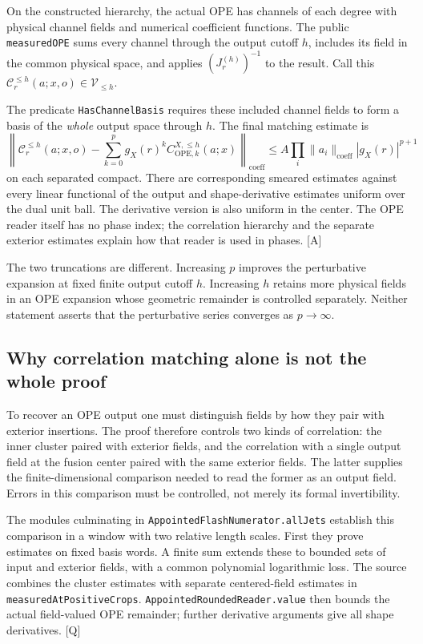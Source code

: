 \documentclass[11pt]{article}
\newcommand{\code}[1]{{\small\nolinkurl{#1}}}
\newcommand{\src}[1]{\textsf{[#1]}}
\begin{document}
On the constructed hierarchy, the actual OPE has channels of each
degree with physical channel fields and numerical coefficient
functions. The public \code{measuredOPE} sums every channel through
the output cutoff $h$, includes its field in the common physical
space, and applies $(J_r^{(h)})^{-1}$ to the result. Call this
$\mathcal C_r^{\le h}(a;x,o)\in\mathcal V_{\le h}$.

The predicate \code{HasChannelBasis} requires these included channel
fields to form a basis of the \emph{whole} output space through $h$.
The final matching estimate is
\begin{equation}\label{eq:ope-bound}
 \left\|\mathcal C_r^{\le h}(a;x,o)
       -\sum_{k=0}^{p}g_X(r)^k C^{X,\le h}_{\mathrm{OPE},k}(a;x)
 \right\|_{\mathrm{coeff}}
 \le A\prod_i\|a_i\|_{\mathrm{coeff}}|g_X(r)|^{p+1}
\end{equation}
on each separated compact. There are corresponding smeared estimates
against every linear functional of the output and shape-derivative
estimates uniform over the dual unit ball. The derivative version is
also uniform in the center. The OPE reader itself has no phase index;
the correlation hierarchy and the separate exterior estimates explain
how that reader is used in phases. \src{A}

The two truncations are different. Increasing $p$ improves the
perturbative expansion at fixed finite output cutoff $h$. Increasing
$h$ retains more physical fields in an OPE expansion whose geometric
remainder is controlled separately. Neither statement asserts that
the perturbative series converges as $p\to\infty$.

\subsection{Why correlation matching alone is not the whole proof}

To recover an OPE output one must distinguish fields by how they pair
with exterior insertions. The proof therefore controls two kinds of
correlation: the inner cluster paired with exterior fields, and the
correlation with a single output field at the fusion center paired
with the same exterior fields. The latter supplies the finite-dimensional
comparison needed to read the former as an output field. Errors in
this comparison must be controlled, not merely its formal invertibility.

The modules culminating in \code{AppointedFlashNumerator.allJets}
establish this comparison in a window with two relative length scales.
First they prove estimates on fixed basis words. A finite sum extends
these to bounded sets of input and exterior fields, with a common
polynomial logarithmic loss. The source combines the cluster estimates
with separate centered-field estimates in
\code{measuredAtPositiveCrops}. \code{AppointedRoundedReader.value}
then bounds the actual field-valued OPE remainder; further derivative
arguments give all shape derivatives. \src{Q}
\end{document}
